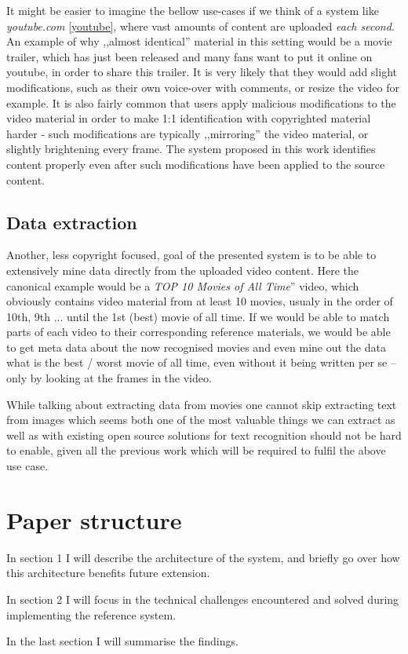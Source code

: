 It might be easier to imagine the bellow use-cases if we think of a system like \textit{youtube.com} \ref{youtube}, where vast amounts of content are uploaded \textit{each second}. An example of why ,,almost identical'' material in this setting would be a movie trailer, which has just been released and many fans want to put it online on youtube, in order to share this trailer. It is very likely that they would add slight modifications, such as their own voice-over with comments, or resize the video for example. It is also fairly common that users apply malicious modifications to the video material in order to make 1:1 identification with copyrighted material harder - such modifications are typically ,,mirroring'' the video material, or slightly brightening every frame. The system proposed in this work identifies content properly even after such modifications have been applied to the source content.

\subsection{Data extraction}

Another, less copyright focused, goal of the presented system is to be able to extensively mine data directly from the uploaded video content.
Here the canonical example would be a \textit{TOP 10 Movies of All Time}'' video, which obviously contains video material from at least 10 movies,
usualy in the order of 10th, 9th ... until the 1st (best) movie of all time. If we would be able to match parts of each video to their corresponding 
reference materials, we would be able to get meta data about the now recognised movies and even mine out the data what is the best / worst movie of all time,
even without it being written per se -- only by looking at the frames in the video. 

While talking about extracting data from movies one cannot skip extracting text from images which seems both one of the most valuable things we can extract as well as with existing open source solutions for text recognition should not be hard to enable, given all the previous work which will be required to fulfil the above use case.

\section{Paper structure}
In section 1 I will describe the architecture of the system, and briefly go over how this architecture benefits future extension.

In section 2 I will focus in the technical challenges encountered and solved during implementing the reference system.

In the last section I will summarise the findings.

